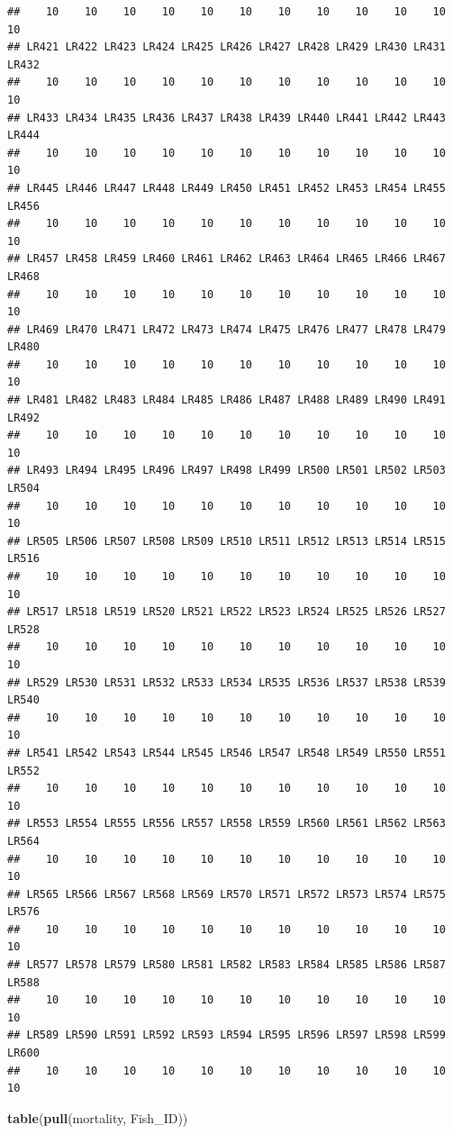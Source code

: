 \documentclass[]{book}
\newenvironment{Shaded}{\begin{snugshade}}{\end{snugshade}}
\newcommand{\KeywordTok}[1]{\textcolor[rgb]{0.13,0.29,0.53}{\textbf{#1}}}
\newcommand{\NormalTok}[1]{#1}
\begin{document}
\begin{verbatim}
##    10    10    10    10    10    10    10    10    10    10    10    10 
## LR421 LR422 LR423 LR424 LR425 LR426 LR427 LR428 LR429 LR430 LR431 LR432 
##    10    10    10    10    10    10    10    10    10    10    10    10 
## LR433 LR434 LR435 LR436 LR437 LR438 LR439 LR440 LR441 LR442 LR443 LR444 
##    10    10    10    10    10    10    10    10    10    10    10    10 
## LR445 LR446 LR447 LR448 LR449 LR450 LR451 LR452 LR453 LR454 LR455 LR456 
##    10    10    10    10    10    10    10    10    10    10    10    10 
## LR457 LR458 LR459 LR460 LR461 LR462 LR463 LR464 LR465 LR466 LR467 LR468 
##    10    10    10    10    10    10    10    10    10    10    10    10 
## LR469 LR470 LR471 LR472 LR473 LR474 LR475 LR476 LR477 LR478 LR479 LR480 
##    10    10    10    10    10    10    10    10    10    10    10    10 
## LR481 LR482 LR483 LR484 LR485 LR486 LR487 LR488 LR489 LR490 LR491 LR492 
##    10    10    10    10    10    10    10    10    10    10    10    10 
## LR493 LR494 LR495 LR496 LR497 LR498 LR499 LR500 LR501 LR502 LR503 LR504 
##    10    10    10    10    10    10    10    10    10    10    10    10 
## LR505 LR506 LR507 LR508 LR509 LR510 LR511 LR512 LR513 LR514 LR515 LR516 
##    10    10    10    10    10    10    10    10    10    10    10    10 
## LR517 LR518 LR519 LR520 LR521 LR522 LR523 LR524 LR525 LR526 LR527 LR528 
##    10    10    10    10    10    10    10    10    10    10    10    10 
## LR529 LR530 LR531 LR532 LR533 LR534 LR535 LR536 LR537 LR538 LR539 LR540 
##    10    10    10    10    10    10    10    10    10    10    10    10 
## LR541 LR542 LR543 LR544 LR545 LR546 LR547 LR548 LR549 LR550 LR551 LR552 
##    10    10    10    10    10    10    10    10    10    10    10    10 
## LR553 LR554 LR555 LR556 LR557 LR558 LR559 LR560 LR561 LR562 LR563 LR564 
##    10    10    10    10    10    10    10    10    10    10    10    10 
## LR565 LR566 LR567 LR568 LR569 LR570 LR571 LR572 LR573 LR574 LR575 LR576 
##    10    10    10    10    10    10    10    10    10    10    10    10 
## LR577 LR578 LR579 LR580 LR581 LR582 LR583 LR584 LR585 LR586 LR587 LR588 
##    10    10    10    10    10    10    10    10    10    10    10    10 
## LR589 LR590 LR591 LR592 LR593 LR594 LR595 LR596 LR597 LR598 LR599 LR600 
##    10    10    10    10    10    10    10    10    10    10    10    10
\end{verbatim}

\begin{Shaded}
\begin{Highlighting}[]
\KeywordTok{table}\NormalTok{(}\KeywordTok{pull}\NormalTok{(mortality, Fish_ID))}
\end{Highlighting}
\end{Shaded}
\end{document}
